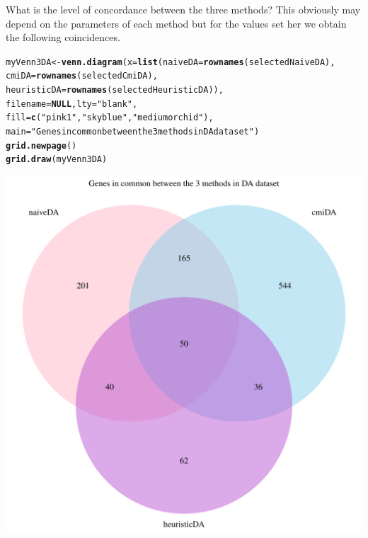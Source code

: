 \documentclass[a4paper,10pt]{article}\usepackage[]{graphicx}\usepackage[]{color}
\makeatletter
\def\maxwidth{ %
  \ifdim\Gin@nat@width>\linewidth
    \linewidth
  \else
    \Gin@nat@width
  \fi
}
\newcommand{\hlstr}[1]{\textcolor[rgb]{0.192,0.494,0.8}{#1}}%
\newcommand{\hlstd}[1]{\textcolor[rgb]{0.345,0.345,0.345}{#1}}%
\newcommand{\hlkwa}[1]{\textcolor[rgb]{0.161,0.373,0.58}{\textbf{#1}}}%
\newcommand{\hlkwb}[1]{\textcolor[rgb]{0.69,0.353,0.396}{#1}}%
\newcommand{\hlkwc}[1]{\textcolor[rgb]{0.333,0.667,0.333}{#1}}%
\newcommand{\hlkwd}[1]{\textcolor[rgb]{0.737,0.353,0.396}{\textbf{#1}}}%
\newenvironment{kframe}{%
 \def\at@end@of@kframe{}%
 \ifinner\ifhmode%
  \def\at@end@of@kframe{\end{minipage}}%
  \begin{minipage}{\columnwidth}%
 \fi\fi%
 \def\FrameCommand##1{\hskip\@totalleftmargin \hskip-\fboxsep
 \colorbox{shadecolor}{##1}\hskip-\fboxsep
     \hskip-\linewidth \hskip-\@totalleftmargin \hskip\columnwidth}%
 \MakeFramed {\advance\hsize-\width
   \@totalleftmargin\z@ \linewidth\hsize
   \@setminipage}}%
 {\par\unskip\endMakeFramed%
 \at@end@of@kframe}
\newenvironment{knitrout}{}{} %
\makeatother
\begin{document}
What is the level of concordance between the three methods? This obviously may depend on the parameters of each method but for the values set her we obtain the following coincidences.

\begin{knitrout}
\color{fgcolor}\begin{kframe}
\begin{alltt}
\hlstd{myVenn3DA}\hlkwb{<-} \hlkwd{venn.diagram}\hlstd{(}\hlkwc{x}\hlstd{=}\hlkwd{list}\hlstd{(}\hlkwc{naiveDA}\hlstd{=}\hlkwd{rownames}\hlstd{(selectedNaiveDA),}
                                \hlkwc{cmiDA}\hlstd{=}\hlkwd{rownames}\hlstd{(selectedCmiDA),}
                                \hlkwc{heuristicDA} \hlstd{=} \hlkwd{rownames}\hlstd{(selectedHeuristicDA)),}
                                \hlkwc{filename}\hlstd{=}\hlkwa{NULL}\hlstd{,} \hlkwc{lty} \hlstd{=} \hlstr{"blank"}\hlstd{,}
                                \hlkwc{fill}\hlstd{=}\hlkwd{c}\hlstd{(}\hlstr{"pink1"}\hlstd{,} \hlstr{"skyblue"}\hlstd{,} \hlstr{"mediumorchid"}\hlstd{),}
                       \hlkwc{main}\hlstd{=}\hlstr{"Genes in common between the 3 methods in DA dataset"}\hlstd{)}
\hlkwd{grid.newpage}\hlstd{()}
\hlkwd{grid.draw}\hlstd{(myVenn3DA)}
\end{alltt}
\end{kframe}
\includegraphics[width=\maxwidth]{figure/compare3DA-1} 

\end{knitrout}
\end{document}
